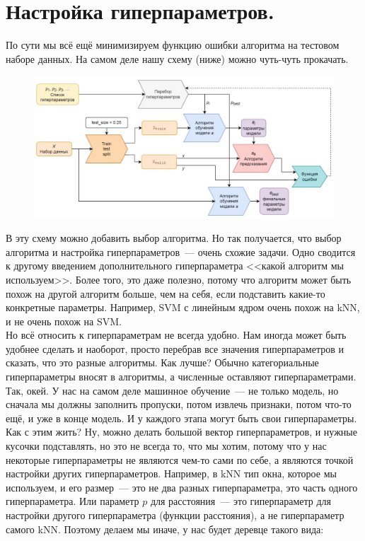 \documentclass{article}
\begin{document}
    \section{Настройка гиперпараметров.}
    По сути мы всё ещё минимизируем функцию ошибки алгоритма на тестовом наборе данных. На самом деле нашу схему (ниже) можно чуть-чуть прокачать.
    \begin{figure}[H]
        \includegraphics{Images/ml_scheme_advanced.png}
    \end{figure}\noindent
    В эту схему можно добавить выбор алгоритма. Но так получается, что выбор алгоритма и настройка гиперпараметров~--- очень схожие задачи. Одно сводится к другому введением дополнительного гиперпараметра <<какой алгоритм мы используем>>. Более того, это даже полезно, потому что алгоритм может быть похож на другой алгоритм больше, чем на себя, если подставить какие-то конкретные параметры. Например, SVM с линейным ядром очень похож на kNN, и не очень похож на SVM.\\
    Но всё относить к гиперпараметрам не всегда удобно. Нам иногда может быть удобнее сделать и наоборот, просто перебрав все значения гиперпараметров и сказать, что это разные алгоритмы. Как лучше? Обычно категориальные гиперпараметры вносят в алгоритмы, а численные оставляют гиперпараметрами.\\
    Так, окей. У нас на самом деле машинное обучение~--- не только модель, но сначала мы должны заполнить пропуски, потом извлечь признаки, потом что-то ещё, и уже в конце модель. И у каждого этапа могут быть свои гиперпараметры. Как с этим жить? Ну, можно делать большой вектор гиперпараметров, и нужные кусочки подставлять, но это не всегда то, что мы хотим, потому что у нас некоторые гиперпараметры не являются чем-то сами по себе, а являются точкой настройки других гиперпараметров. Например, в kNN тип окна, которое мы используем, и его размер~--- это не два разных гиперпараметра, это часть одного гиперпараметра. Или параметр $p$ для расстояния~--- это гиперпараметр для настройки другого гиперпараметра (функции расстояния), а не гиперпараметр самого kNN. Поэтому делаем мы иначе, у нас будет деревце такого вида:
\end{document}
